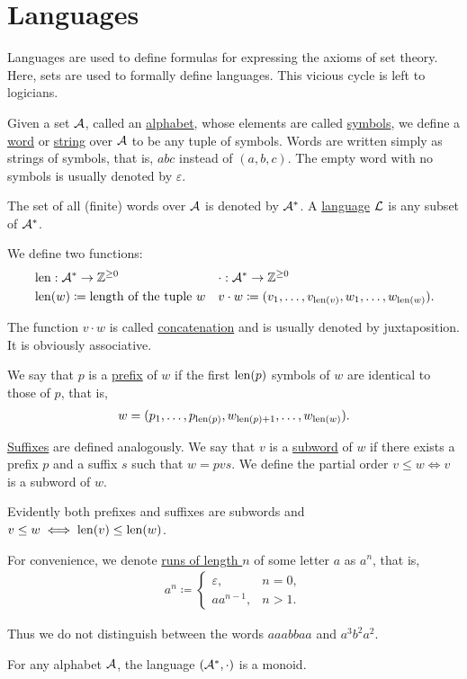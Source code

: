 \section{Languages}\label{sec:languages}

Languages are used to define formulas for expressing the axioms of set theory. Here, sets are used to formally define languages. This vicious cycle is left to logicians.

\begin{definition}\label{def:language}
  Given a set $\mathcal A$, called an \ul{alphabet}, whose elements are called \ul{symbols}, we define a \ul{word} or \ul{string} over $\mathcal A$ to be any tuple of symbols. Words are written simply as strings of symbols, that is, $abc$ instead of $(a, b, c)$. The empty word with no symbols is usually denoted by $\varepsilon$.

  The set of all (finite) words over $\mathcal A$ is denoted by $\mathcal A^{*}$. A \ul{language} $\mathcal L$ is any subset of $\mathcal A^{*}$.

  We define two functions:
  \begin{align*}
    &\operatorname{len}: \mathcal A^{*} \to \mathbb Z^{\geq 0}
    &&\cdot: \mathcal A^{*} \to \mathbb Z^{\geq 0}
    \\
    &\operatorname{len}(w) \coloneqq \text{length of the tuple } w
    &&v \cdot w \coloneqq (v_1, \ldots, v_{\operatorname{len}(v)}, w_1, \ldots, w_{\operatorname{len}(w)}).
  \end{align*}

  The function $v \cdot w$ is called \ul{concatenation} and is usually denoted by juxtaposition. It is obviously associative.

  We say that $p$ is a \ul{prefix} of $w$ if the first $\operatorname{len}(p)$ symbols of $w$ are identical to those of $p$, that is,
  \begin{align*}
    w = (p_1, \ldots, p_{\operatorname{len}(p)}, w_{\operatorname{len}(p) + 1}, \ldots, w_{\operatorname{len}(w)}).
  \end{align*}

  \ul{Suffixes} are defined analogously. We say that $v$ is a \ul{subword} of $w$ if there exists a prefix $p$ and a suffix $s$ such that $w = pvs$. We define the partial order $v \leq w \iff v$ is a subword of $w$.

  Evidently both prefixes and suffixes are subwords and $v \leq w \iff \operatorname{len}(v) \leq \operatorname{len}(w)$.

  For convenience, we denote \ul{runs of length $n$} of some letter $a$ as $a^n$, that is,
  \begin{align*}
    a^n \coloneqq \begin{cases}
      \varepsilon, &n = 0, \\
      a a^{n-1}, &n > 1.
    \end{cases}
  \end{align*}

  Thus we do not distinguish between the words $aaabbaa$ and $a^3 b^2 a^2$.
\end{definition}

\begin{proposition}\label{thm:set_of_all_words_is_monoid}
  For any alphabet $\mathcal A$, the language $(\mathcal A^{*}, \cdot)$ is a monoid.
\end{proposition}
